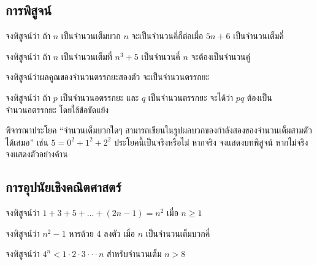 \subsection*{การพิสูจน์}
\begin{exercise}
จงพิสูจน์ว่า ถ้า $n$ เป็นจำนวนเต็มบวก $n$ จะเป็นจำนวนคี่ก็ต่อเมื่อ $5n+6$ เป็นจำนวนเต็มคี่
\end{exercise}
\begin{exercise}
จงพิสูจน์ว่า ถ้า $n$ เป็นจำนวนเต็มที่ $n^3+5$ เป็นจำนวนคี่ $n$ จะต้องเป็นจำนวนคู่
\end{exercise}
\begin{exercise}
จงพิสูจน์ว่าผลคูณของจำนวนตรรกยะสองตัว จะเป็นจำนวนตรรกยะ
\end{exercise}
\begin{exercise}
จงพิสูจน์ว่า ถ้า $p$ เป็นจำนวนอตรรกยะ และ $q$ เป็นจำนวนตรรกยะ จะได้ว่า $pq$ ต้องเป็นจำนวนอตรรกยะ โดยใช้ข้อขัดแย้ง
\end{exercise}
\begin{exercise}
พิจารณาประโยค ``จำนวนเต็มบวกใดๆ สามารถเขียนในรูปผลบวกของกำลังสองของจำนวนเต็มสามตัวได้เสมอ'' เช่น $5=0^2+1^2+2^2$ ประโยคนี้เป็นจริงหรือไม่ หากจริง จงแสดงบทพิสูจน์ หากไม่จริง จงแสดงตัวอย่างค้าน
\end{exercise}
\subsection*{การอุปนัยเชิงคณิตศาสตร์}
\begin{exercise}
จงพิสูจน์ว่า $1+3+5+...+(2n-1)=n^2$ เมื่อ $n \geq 1$
\end{exercise}
\begin{exercise}
จงพิสูจน์ว่า $n^2-1$ หารด้วย 4 ลงตัว เมื่อ $n$ เป็นจำนวนเต็มบวกคี่
\end{exercise}
\begin{exercise}
จงพิสูจน์ว่า $4^n < 1 \cdot 2 \cdot 3 \cdot \cdot \cdot n$ สำหรับจำนวนเต็ม $n>8$
\end{exercise}